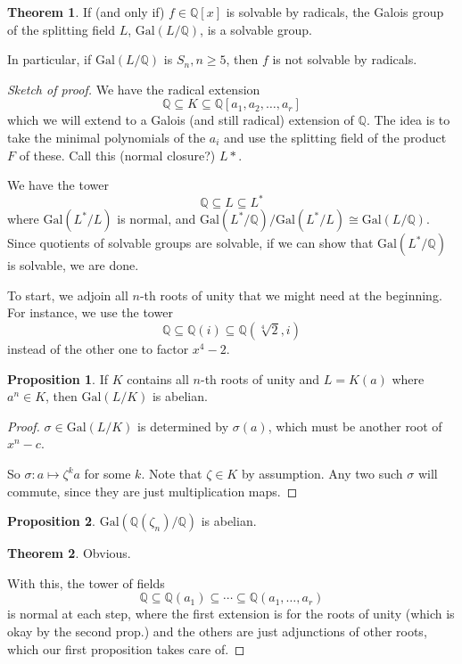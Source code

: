 \documentclass{article}
\newcommand{\Q}{\mathbb Q}
\newcommand{\gal}[2]{\text{Gal}(#1/#2)}
\theoremstyle{definition}
\newtheorem*{thm}{Theorem}
\newtheorem*{prop}{Proposition}
\begin{document}
\begin{thm}
 If (and only if) $f\in\Q[x]$ is solvable by radicals, the Galois group of the
 splitting field $L$, $\gal L\Q$, is a solvable group.

 In particular, if $\gal L\Q$ is $S_n, n\geq 5$, then $f$ is not solvable by radicals.
\end{thm}
\begin{proof}[Sketch of proof]
  We have the radical extension
  $$\Q\subseteq K\subseteq \Q[a_1,a_2,\ldots,a_r]$$
  which we will extend to a Galois (and still radical) extension of $\Q$. The
  idea is to take the minimal polynomials of the $a_i$ and use the splitting
  field of the product $F$ of these. Call this (normal closure?) $L*$.

  We have the tower
  $$\Q\subseteq L\subseteq L^*$$
  where $\gal {L^*} L$ is normal, and $\gal {L^*} \Q / \gal {L^*} L \cong \gal L
  \Q$. Since quotients of solvable groups are solvable, if we can show that
  $\gal {L^*} \Q$ is solvable, we are done.

  To start, we adjoin all $n$-th roots of unity that we might need at the
  beginning. For instance, we use the tower
  $$\Q \subseteq \Q(i)\subseteq\Q(\sqrt[4]2,i)$$
  instead of the other one to factor $x^4-2$.

  \begin{prop}
    If $K$ contains all $n$-th roots of unity and $L=K(a)$ where $a^n \in K$,
    then $\gal L K$ is abelian.
  \end{prop}
  \begin{proof}
  $\sigma \in \gal L K$ is determined by $\sigma(a)$, which must be another root
  of $x^n - c$.

  So $\sigma : a\mapsto \zeta^k a$ for some $k$. Note that $\zeta \in K$ by
  assumption. Any two such $\sigma$ will commute, since they are just
  multiplication maps.
 \end{proof}
 \begin{prop}
   $\gal {\Q(\zeta_n)} \Q$ is abelian.
 \end{prop} 
 \begin{thm}
  Obvious. 
 \end{thm}
 With this, the tower of fields
 $$\Q \subseteq \Q(a_1) \subseteq \cdots \subseteq \Q(a_1,\ldots,a_r)$$
 is normal at each step, where the first extension is for the roots of unity
 (which is okay by the second prop.) and the others are just adjunctions of
 other roots, which our first proposition takes care of.
\end{proof}
\end{document}
